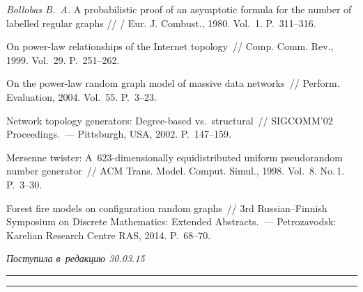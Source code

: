 \begin{multicols}{2}
{{\begin{thebibliography}{99}
\textit{Bollobas B.~A.} A probabilistic proof of an asymptotic formula
for the number of labelled regular graphs // / Eur. J. Combust., 1980. Vol.~1. P.~311--316.

 On power-law
relationships of the Internet topology~// Comp. Comm. Rev., 1999.
Vol.~29. P.~251--262.

 On the power-law random
graph model of massive data networks~// Perform. Evaluation,
2004. Vol.~55. P.~3--23.

Network topology generators: Degree-based vs.\ structural~//
SIGCOMM'02 Proceedings.~--- Pittsburgh, USA, 2002. P.~147--159.

 Mersenne twister: A~623-dimensionally
equidistributed uniform pseudorandom number generator~// ACM Trans.
Model. Comput. Simul., 1998. Vol.~8. No.\,1. P.~3--30.

 Forest fire models on configuration random graphs~//
3rd Russian--Finnish Symposium on Discrete Mathematics: Extended Abstracts.~---
Petrozavodsk: Karelian Research Centre RAS, 2014. P.~68--70.

 \end{thebibliography}

 }
 }

\end{multicols}

\vspace*{-6pt}

\hfill{\small\textit{Поступила в~редакцию 30.03.15}}


\vspace*{18pt}

\hrule

\vspace*{2pt}

\hrule

\vspace*{6pt}

\def\tit{FOREST FIRE ON~A~CONFIGURATION GRAPH WITH~RANDOM~FIRE~PROPAGATION}

\def\titkol{Forest fire on a configuration graph with random fire propagation}

\def\aut{M.\,M.~Leri}

\def\autkol{M.\,M.~Leri}

